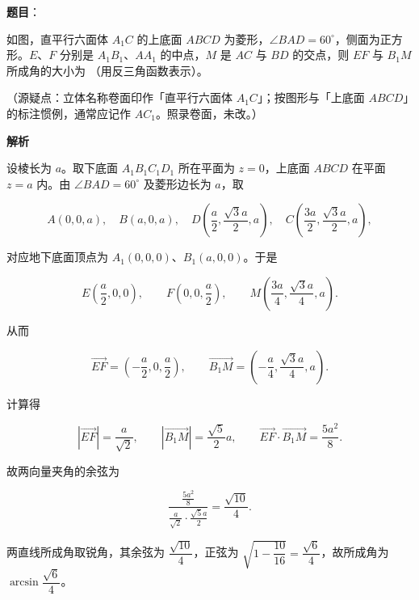 \begin{answer}

\textbf{题目}：

如图，直平行六面体 $A_{1}C$ 的上底面 $ABCD$ 为菱形，$\angle BAD=60^{\circ}$，侧面为正方形。$E$、$F$ 分别是 $A_{1}B_{1}$、$AA_{1}$ 的中点，$M$ 是 $AC$ 与 $BD$ 的交点，则 $EF$ 与 $B_{1}M$ 所成角的大小为 \gkblank{}（用反三角函数表示）。
\nopagebreak[4]
\begin{center}\end{center}
\nopagebreak[4]
（源疑点：立体名称卷面印作「直平行六面体 $A_{1}C$」；按图形与「上底面 $ABCD$」的标注惯例，通常应记作 $AC_{1}$。照录卷面，未改。）

\textbf{解析}

设棱长为 $a$。取下底面 $A_{1}B_{1}C_{1}D_{1}$ 所在平面为 $z=0$，上底面 $ABCD$ 在平面 $z=a$ 内。由 $\angle BAD=60^{\circ}$ 及菱形边长为 $a$，取

\nopagebreak[4]
\[
A(0,0,a),\quad B(a,0,a),\quad D\left(\frac{a}{2},\frac{\sqrt{3}a}{2},a\right),\quad C\left(\frac{3a}{2},\frac{\sqrt{3}a}{2},a\right),
\]

对应地下底面顶点为 $A_{1}(0,0,0)$、$B_{1}(a,0,0)$。于是

\nopagebreak[4]
\[
E\left(\frac{a}{2},0,0\right),\qquad F\left(0,0,\frac{a}{2}\right),\qquad M\left(\frac{3a}{4},\frac{\sqrt{3}a}{4},a\right).
\]

从而

\nopagebreak[4]
\[
\overrightarrow{EF}=\left(-\frac{a}{2},0,\frac{a}{2}\right),\qquad
\overrightarrow{B_{1}M}=\left(-\frac{a}{4},\frac{\sqrt{3}a}{4},a\right).
\]

计算得

\nopagebreak[4]
\[
|\overrightarrow{EF}|=\frac{a}{\sqrt{2}},\qquad |\overrightarrow{B_{1}M}|=\frac{\sqrt{5}}{2}a,\qquad
\overrightarrow{EF}\cdot\overrightarrow{B_{1}M}=\frac{5a^{2}}{8}.
\]

故两向量夹角的余弦为

\nopagebreak[4]
\[
\frac{\frac{5a^{2}}{8}}{\frac{a}{\sqrt{2}}\cdot\frac{\sqrt{5}a}{2}}=\frac{\sqrt{10}}{4}.
\]

两直线所成角取锐角，其余弦为 $\dfrac{\sqrt{10}}{4}$，正弦为 $\sqrt{1-\dfrac{10}{16}}=\dfrac{\sqrt{6}}{4}$，故所成角为 $\arcsin\dfrac{\sqrt{6}}{4}$。


\end{answer}


